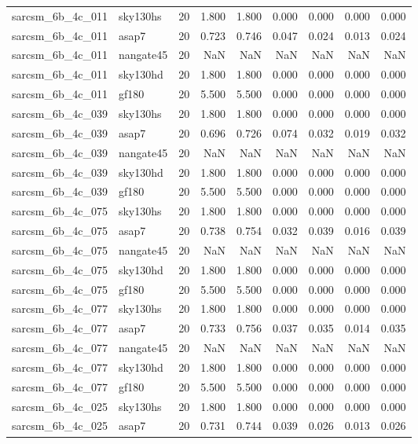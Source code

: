 \begin{tabular}{llrrrrrrr}
sarcsm\_6b\_4c\_011 & sky130hs & 20 & 1.800 & 1.800 & 0.000 & 0.000 & 0.000 & 0.000 \\
sarcsm\_6b\_4c\_011 & asap7 & 20 & 0.723 & 0.746 & 0.047 & 0.024 & 0.013 & 0.024 \\
sarcsm\_6b\_4c\_011 & nangate45 & 20 & NaN & NaN & NaN & NaN & NaN & NaN \\
sarcsm\_6b\_4c\_011 & sky130hd & 20 & 1.800 & 1.800 & 0.000 & 0.000 & 0.000 & 0.000 \\
sarcsm\_6b\_4c\_011 & gf180 & 20 & 5.500 & 5.500 & 0.000 & 0.000 & 0.000 & 0.000 \\
sarcsm\_6b\_4c\_039 & sky130hs & 20 & 1.800 & 1.800 & 0.000 & 0.000 & 0.000 & 0.000 \\
sarcsm\_6b\_4c\_039 & asap7 & 20 & 0.696 & 0.726 & 0.074 & 0.032 & 0.019 & 0.032 \\
sarcsm\_6b\_4c\_039 & nangate45 & 20 & NaN & NaN & NaN & NaN & NaN & NaN \\
sarcsm\_6b\_4c\_039 & sky130hd & 20 & 1.800 & 1.800 & 0.000 & 0.000 & 0.000 & 0.000 \\
sarcsm\_6b\_4c\_039 & gf180 & 20 & 5.500 & 5.500 & 0.000 & 0.000 & 0.000 & 0.000 \\
sarcsm\_6b\_4c\_075 & sky130hs & 20 & 1.800 & 1.800 & 0.000 & 0.000 & 0.000 & 0.000 \\
sarcsm\_6b\_4c\_075 & asap7 & 20 & 0.738 & 0.754 & 0.032 & 0.039 & 0.016 & 0.039 \\
sarcsm\_6b\_4c\_075 & nangate45 & 20 & NaN & NaN & NaN & NaN & NaN & NaN \\
sarcsm\_6b\_4c\_075 & sky130hd & 20 & 1.800 & 1.800 & 0.000 & 0.000 & 0.000 & 0.000 \\
sarcsm\_6b\_4c\_075 & gf180 & 20 & 5.500 & 5.500 & 0.000 & 0.000 & 0.000 & 0.000 \\
sarcsm\_6b\_4c\_077 & sky130hs & 20 & 1.800 & 1.800 & 0.000 & 0.000 & 0.000 & 0.000 \\
sarcsm\_6b\_4c\_077 & asap7 & 20 & 0.733 & 0.756 & 0.037 & 0.035 & 0.014 & 0.035 \\
sarcsm\_6b\_4c\_077 & nangate45 & 20 & NaN & NaN & NaN & NaN & NaN & NaN \\
sarcsm\_6b\_4c\_077 & sky130hd & 20 & 1.800 & 1.800 & 0.000 & 0.000 & 0.000 & 0.000 \\
sarcsm\_6b\_4c\_077 & gf180 & 20 & 5.500 & 5.500 & 0.000 & 0.000 & 0.000 & 0.000 \\
sarcsm\_6b\_4c\_025 & sky130hs & 20 & 1.800 & 1.800 & 0.000 & 0.000 & 0.000 & 0.000 \\
sarcsm\_6b\_4c\_025 & asap7 & 20 & 0.731 & 0.744 & 0.039 & 0.026 & 0.013 & 0.026 \\

\end{tabular}
